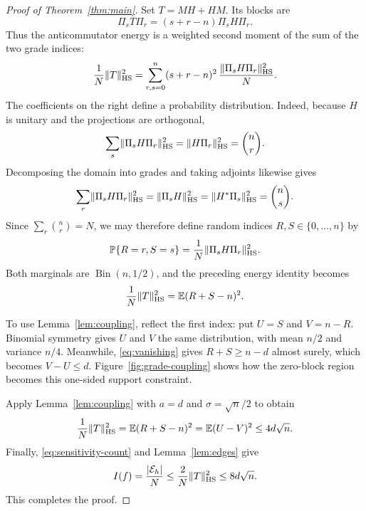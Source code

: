 \begin{proof}[Proof of Theorem~\ref{thm:main}]
Set $T=MH+HM$. Its blocks are
\begin{equation}\label{eq:T-blocks}
 \Pi_sT\Pi_r=(s+r-n)\Pi_sH\Pi_r.
\end{equation}
Thus the anticommutator energy is a weighted second moment of the sum of
the two grade indices:
\[
 \frac1N\lVert T\rVert_{\mathrm{HS}}^2
 =\sum_{r,s=0}^n(s+r-n)^2\,
   \frac{\lVert \Pi_sH\Pi_r\rVert_{\mathrm{HS}}^2}{N}.
\]
The coefficients on the right define a probability distribution. Indeed,
because $H$ is unitary and the projections are orthogonal,
\[
 \sum_s\lVert \Pi_sH\Pi_r\rVert_{\mathrm{HS}}^2
 =\lVert H\Pi_r\rVert_{\mathrm{HS}}^2=\binom nr.
\]
Decomposing the domain into grades and taking adjoints likewise gives
\[
 \sum_r\lVert \Pi_sH\Pi_r\rVert_{\mathrm{HS}}^2
 =\lVert \Pi_sH\rVert_{\mathrm{HS}}^2
 =\lVert H^*\Pi_s\rVert_{\mathrm{HS}}^2=\binom ns.
\]
Since $\sum_r\binom nr=N$, we may therefore define random indices
$R,S\in\{0,\ldots,n\}$ by
\begin{equation}\label{eq:block-coupling}
 \mathbb P\{R=r,S=s\}=\frac1N\lVert \Pi_sH\Pi_r\rVert_{\mathrm{HS}}^2.
\end{equation}
Both marginals are $\operatorname{Bin}(n,1/2)$, and the preceding energy
identity becomes
\[
 \frac1N\lVert T\rVert_{\mathrm{HS}}^2=\mathbb E(R+S-n)^2.
\]

To use Lemma~\ref{lem:coupling}, reflect the first index: put $U=S$ and
$V=n-R$. Binomial symmetry gives $U$ and $V$ the same distribution,
with mean $n/2$ and variance $n/4$. Meanwhile,
\eqref{eq:vanishing} gives $R+S\ge n-d$ almost surely, which becomes
$V-U\le d$. Figure~\ref{fig:grade-coupling} shows how the zero-block
region becomes this one-sided support constraint.



Apply Lemma~\ref{lem:coupling} with $a=d$ and $\sigma=\sqrt n/2$ to obtain
\begin{equation}\label{eq:coupling-bound}
 \frac1N\lVert T\rVert_{\mathrm{HS}}^2
 =\mathbb E(R+S-n)^2=\mathbb E(U-V)^2\le4d\sqrt n.
\end{equation}
Finally, \eqref{eq:sensitivity-count} and Lemma~\ref{lem:edges} give
\[
 I(f)=\frac{\lvert \mathcal E_h\rvert}N
 \le\frac2N\lVert T\rVert_{\mathrm{HS}}^2
 \le8d\sqrt n.
\]
This completes the proof.
\end{proof}



